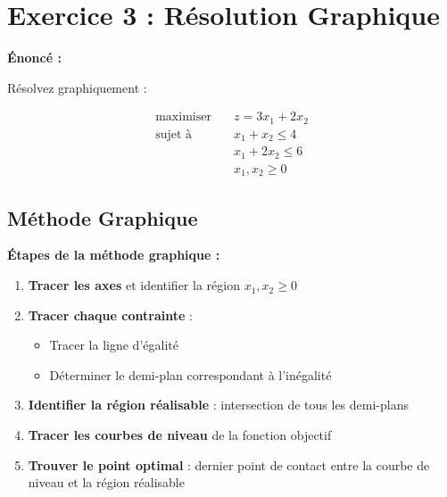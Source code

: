 \documentclass[12pt,a4paper]{article}
\begin{document}
\newpage
\section{Exercice 3 : Résolution Graphique}

\begin{exercice}
\textbf{Énoncé :}

Résolvez graphiquement :

\begin{align*}
\text{maximiser} \quad & z = 3x_1 + 2x_2\\
\text{sujet à} \quad & x_1 + x_2 \leq 4\\
& x_1 + 2x_2 \leq 6\\
& x_1, x_2 \geq 0
\end{align*}
\end{exercice}

\subsection{Méthode Graphique}

\begin{methode}
\textbf{Étapes de la méthode graphique :}

\begin{enumerate}
    \item \textcolor{titrebleu}{\textbf{Tracer les axes}} et identifier la région $x_1, x_2 \geq 0$
    
    \item \textcolor{defvert}{\textbf{Tracer chaque contrainte}} :
    \begin{itemize}
        \item Tracer la ligne d'égalité
        \item Déterminer le demi-plan correspondant à l'inégalité
    \end{itemize}
    
    \item \textcolor{algoviolet}{\textbf{Identifier la région réalisable}} : intersection de tous les demi-plans
    
    \item \textcolor{exempleorange}{\textbf{Tracer les courbes de niveau}} de la fonction objectif
    
    \item \textcolor{importantrouge}{\textbf{Trouver le point optimal}} : dernier point de contact entre la courbe de niveau et la région réalisable
\end{enumerate}
\end{methode}
\end{document}
